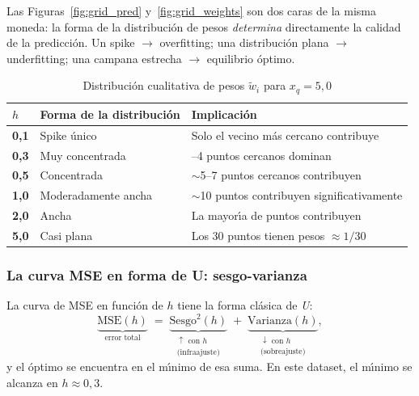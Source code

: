 \documentclass[12pt,a4paper]{article}
\newcommand{\caja}[1]{%
  \vspace{6pt}%
  \noindent\colorbox{cajaFondo}{\parbox{\dimexpr\linewidth-2\fboxsep}{%
    \color{azulTDS}\small #1}}%
  \vspace{6pt}%
}
\begin{document}
\caja{Las Figuras~\ref{fig:grid_pred} y~\ref{fig:grid_weights} son dos caras
de la misma moneda: la forma de la distribuci\'on de pesos \emph{determina}
directamente la calidad de la predicci\'on. Un spike $\to$ overfitting; una
distribuci\'on plana $\to$ underfitting; una campana estrecha $\to$ equilibrio \'optimo.}

\begin{table}[H]
\centering
\caption{Distribuci\'on cualitativa de pesos $\tilde{w}_i$ para $x_q = 5{,}0$}
\label{tab:weights}
\renewcommand{\arraystretch}{1.4}
\begin{tabular}{>{\centering\bfseries}p{1.5cm}
                >{\centering}p{3.2cm}
                >{\centering\arraybackslash}p{6.2cm}}
\toprule
\rowcolor{azulTDS!15}
$h$ & Forma de la distribuci\'on & Implicaci\'on \\
\midrule
0,1 & Spike \'unico & Solo el vecino m\'as cercano contribuye \\
\rowcolor{grisClaro}
0,3 & Muy concentrada & 2--4 puntos cercanos dominan \\
0,5 & Concentrada & $\sim$5--7 puntos cercanos contribuyen \\
\rowcolor{grisClaro}
1,0 & Moderadamente ancha & $\sim$10 puntos contribuyen significativamente \\
2,0 & Ancha & La mayor\'{\i}a de puntos contribuyen \\
\rowcolor{grisClaro}
5,0 & Casi plana & Los 30 puntos tienen pesos $\approx 1/30$ \\
\bottomrule
\end{tabular}
\end{table}

\subsubsection{La curva MSE en forma de U: sesgo-varianza}

La curva de MSE en funci\'on de $h$ tiene la forma cl\'asica de \emph{U}:
\begin{equation*}
  \underbrace{\text{MSE}(h)}_{\text{error total}}
  \;=\;
  \underbrace{\text{Sesgo}^2(h)}_{\substack{\uparrow \text{ con } h \\ \text{(infraajuste)}}}
  \;+\;
  \underbrace{\text{Varianza}(h)}_{\substack{\downarrow \text{ con } h \\ \text{(sobreajuste)}}},
\end{equation*}
y el \'optimo se encuentra en el m\'{\i}nimo de esa suma. En este dataset, el
m\'{\i}nimo se alcanza en $h \approx 0{,}3$.
\end{document}
